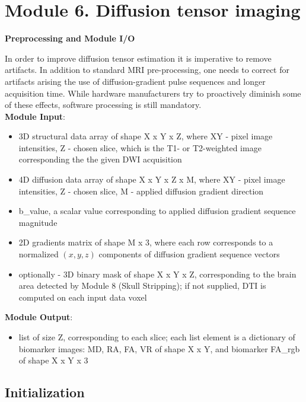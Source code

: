 \section{Module 6. Diffusion tensor imaging}

\textbf{Preprocessing and Module I/O}

In order to improve diffusion tensor estimation it is imperative to
remove artifacts. In addition to standard MRI pre-processing, one
needs to correct for artifacts arising the use of diffusion-gradient
pulse sequences and longer acquisition time. While hardware manufacturers
try to proactively diminish some of these effects, software processing
is still mandatory. 
\hfill\\

\textbf{Module Input}:
\begin{itemize}
	\item 
	3D structural data array of shape X x Y x Z, where XY - pixel image intensities, Z - chosen slice, which is the T1- or T2-weighted image corresponding the the given DWI acquisition
	
	\item 
	4D diffusion data array of shape X x Y x Z x M, where XY - pixel image intensities, Z - chosen slice, M - applied diffusion gradient direction
	
	\item 
	b\_value, a scalar value corresponding to applied diffusion gradient sequence magnitude
	
	\item 
	2D gradients matrix of shape M x 3, where each row corresponds to a normalized $(x,y,z)$ components of diffusion gradient sequence vectors
		
	\item 
	optionally - 3D binary mask of shape X x Y x Z, corresponding to the brain area detected by Module 8 (Skull Stripping); if not supplied, DTI is computed on each input data voxel

\end{itemize}
\hfill

\textbf{Module Output}:
\begin{itemize}
	\item
	list of size Z, corresponding to each slice; each list element is a dictionary of biomarker images: MD, RA, FA, VR of shape X x Y, and biomarker FA\_rgb of shape X x Y x 3
\end{itemize}

\subsection{Initialization}

